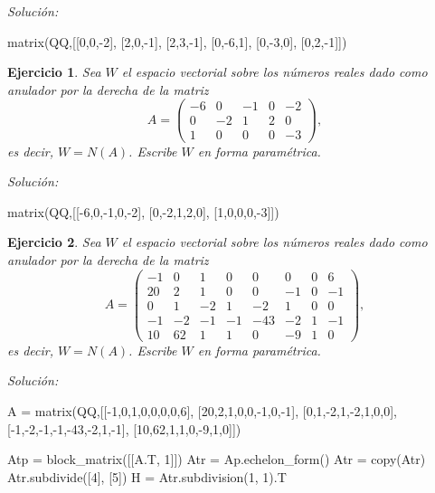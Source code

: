 \documentclass{amsart}
\newtheorem{ejer}{Ejercicio}
\begin{document}
{\it Soluci\'on:}

\begin{sageblock}
matrix(QQ,[[0,0,-2],
[2,0,-1],
[2,3,-1],
[0,-6,1],
[0,-3,0],
[0,2,-1]])
\end{sageblock}



\begin{ejer} Sea $W$ el espacio vectorial sobre los números reales dado
como anulador por la derecha de la matriz 
\[A = \left(\begin{array}{rrrrr}
-6 & 0 & -1 & 0 & -2 \\
0 & -2 & 1 & 2 & 0 \\
1 & 0 & 0 & 0 & -3
\end{array}\right),\]
es decir, $W = N(A)$. Escribe $W$ en forma param\'etrica.
\end{ejer}

{\it Soluci\'on:}

\begin{sageblock}
matrix(QQ,[[-6,0,-1,0,-2],
[0,-2,1,2,0],
[1,0,0,0,-3]])
\end{sageblock}



\begin{ejer} Sea $W$ el espacio vectorial sobre los números reales dado
como anulador por la derecha de la matriz 
\[A = \left(\begin{array}{rrrrrrrr}
-1 & 0 & 1 & 0 & 0 & 0 & 0 & 6 \\
20 & 2 & 1 & 0 & 0 & -1 & 0 & -1 \\
0 & 1 & -2 & 1 & -2 & 1 & 0 & 0 \\
-1 & -2 & -1 & -1 & -43 & -2 & 1 & -1 \\
10 & 62 & 1 & 1 & 0 & -9 & 1 & 0
\end{array}\right),\]
es decir, $W = N(A)$. Escribe $W$ en forma param\'etrica.
\end{ejer}

{\it Soluci\'on:}

\begin{sageblock}
A = matrix(QQ,[[-1,0,1,0,0,0,0,6],
[20,2,1,0,0,-1,0,-1],
[0,1,-2,1,-2,1,0,0],
[-1,-2,-1,-1,-43,-2,1,-1],
[10,62,1,1,0,-9,1,0]])

Atp = block_matrix([[A.T, 1]])
Atr = Ap.echelon_form()
Atr = copy(Atr)
Atr.subdivide([4], [5])
H = Atr.subdivision(1, 1).T
\end{sageblock}
\end{document}
